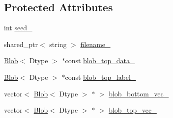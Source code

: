 \subsection*{Protected Attributes}
\begin{DoxyCompactItemize}
\item 
int \hyperlink{classcaffe_1_1_image_data_layer_test_a924f088ff064f4b906f55afb402dad96}{seed\+\_\+}
\item 
shared\+\_\+ptr$<$ string $>$ \hyperlink{classcaffe_1_1_image_data_layer_test_a88c92cbd5af9edcd0f0c3b0866b1a637}{filename\+\_\+}
\item 
\hyperlink{classcaffe_1_1_blob}{Blob}$<$ Dtype $>$ $\ast$const \hyperlink{classcaffe_1_1_image_data_layer_test_a6e19bc2019229f48d4c4144be5c45862}{blob\+\_\+top\+\_\+data\+\_\+}
\item 
\hyperlink{classcaffe_1_1_blob}{Blob}$<$ Dtype $>$ $\ast$const \hyperlink{classcaffe_1_1_image_data_layer_test_aa134584d35b9b3a7a8a6d3a124be3bc9}{blob\+\_\+top\+\_\+label\+\_\+}
\item 
vector$<$ \hyperlink{classcaffe_1_1_blob}{Blob}$<$ Dtype $>$ $\ast$ $>$ \hyperlink{classcaffe_1_1_image_data_layer_test_a79a6acfec89c11df35f53489d7ea5912}{blob\+\_\+bottom\+\_\+vec\+\_\+}
\item 
vector$<$ \hyperlink{classcaffe_1_1_blob}{Blob}$<$ Dtype $>$ $\ast$ $>$ \hyperlink{classcaffe_1_1_image_data_layer_test_a88ea0aa61835ea8c448c21938c39b75a}{blob\+\_\+top\+\_\+vec\+\_\+}
\end{DoxyCompactItemize}


